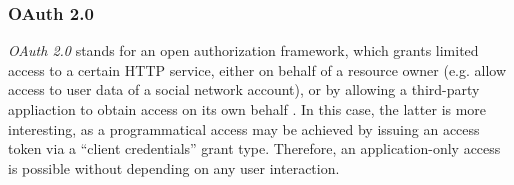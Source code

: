 

\subsubsection{OAuth 2.0}
\emph{OAuth 2.0} stands for an open authorization framework, which grants limited access to a certain HTTP service, either on behalf of a resource owner (e.g. allow access to user data of a social network account), or by allowing a third-party appliaction to obtain access on its own behalf \cite{hardt2012oauth}. In this case, the latter is more interesting, as a programmatical access may be achieved by issuing an access token via a ``client credentials'' grant type. Therefore, an application-only access is possible without depending on any user interaction.

